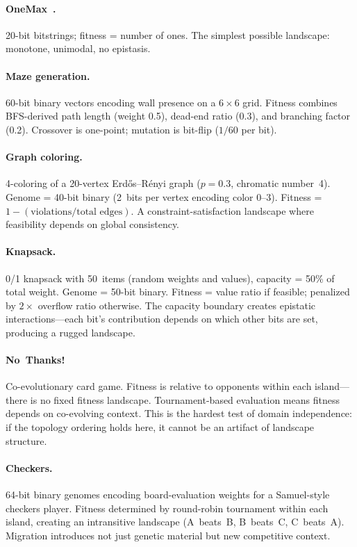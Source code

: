 \documentclass[dvipsnames,format=sigconf,anonymous=false,review=false]{acmart}
\begin{document}
\paragraph{OneMax~\cite{mitchell1992royal}.}
20-bit bitstrings; fitness = number of ones. The simplest possible landscape: monotone, unimodal, no epistasis.

\paragraph{Maze generation.}
60-bit binary vectors encoding wall presence on a $6 \times 6$ grid. Fitness combines BFS-derived path length (weight 0.5), dead-end ratio (0.3), and branching factor (0.2). Crossover is one-point; mutation is bit-flip ($1/60$ per bit).

\paragraph{Graph coloring.}
4-coloring of a 20-vertex Erd\H{o}s--R\'{e}nyi graph ($p = 0.3$, chromatic number~4). Genome = 40-bit binary (2~bits per vertex encoding color 0--3). Fitness = $1 - (\text{violations}/\text{total edges})$. A constraint-satisfaction landscape where feasibility depends on global consistency.

\paragraph{Knapsack.}
0/1 knapsack with 50~items (random weights and values), capacity = 50\% of total weight. Genome = 50-bit binary. Fitness = value ratio if feasible; penalized by $2\times$ overflow ratio otherwise. The capacity boundary creates epistatic interactions---each bit's contribution depends on which other bits are set, producing a rugged landscape.

\paragraph{No~Thanks!}
Co-evolutionary card game. Fitness is relative to opponents within each island---there is no fixed fitness landscape. Tournament-based evaluation means fitness depends on co-evolving context. This is the hardest test of domain independence: if the topology ordering holds here, it cannot be an artifact of landscape structure.

\paragraph{Checkers.}
64-bit binary genomes encoding board-evaluation weights for a Samuel-style~\cite{samuel1959checkers} checkers player. Fitness determined by round-robin tournament within each island, creating an intransitive landscape (A~beats~B, B~beats~C, C~beats~A). Migration introduces not just genetic material but new competitive context.
\end{document}
